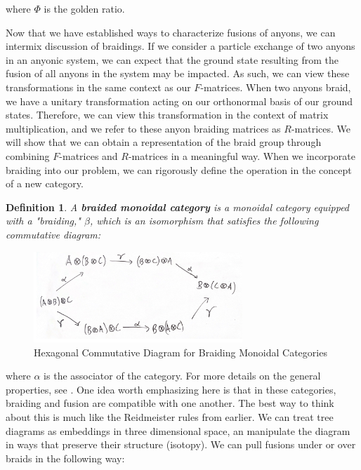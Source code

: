 \documentclass[10pt]{ucthesis}
\newtheorem{definition}{Definition}[chapter]
\begin{document}
where $\Phi$ is the golden ratio.

Now that we have established ways to characterize fusions of anyons, we can intermix discussion of braidings. If we consider a particle exchange of two anyons in an anyonic system, we can expect that the ground state resulting from the fusion of all anyons in the system may be impacted. As such, we can view these transformations in the same context as our $F$-matrices. When two anyons braid, we have a unitary transformation acting on our orthonormal basis of our ground states. Therefore, we can view this transformation in the context of matrix multiplication, and we refer to these anyon braiding matrices as $R$-matrices. We will show that we can obtain a representation of the braid group through combining $F$-matrices and $R$-matrices in a meaningful way. When we incorporate braiding into our problem, we can rigorously define the operation in the concept of a new category.


\begin{definition}
	A \textbf{braided monoidal category} is a monoidal category equipped with a "braiding," $\beta$, which is an isomorphism that satisfies the following commutative diagram:
\end{definition}

\begin{figure}[H]
	\centering
	\includegraphics[width=0.7\textwidth]{hexdiag}
	\caption{Hexagonal Commutative Diagram for Braiding Monoidal Categories}
\end{figure}

where $\alpha$ is the associator of the category. For more details on the general properties, see \cite{Joyal}. One idea worth emphasizing here is that in these categories, braiding and fusion are compatible with one another. The best way to think about this is much like the Reidmeister rules from earlier. We can treat tree diagrams as embeddings in three dimensional space, an manipulate the diagram in ways that preserve their structure (isotopy). We can pull fusions under or over braids in the following way:
\end{document}
